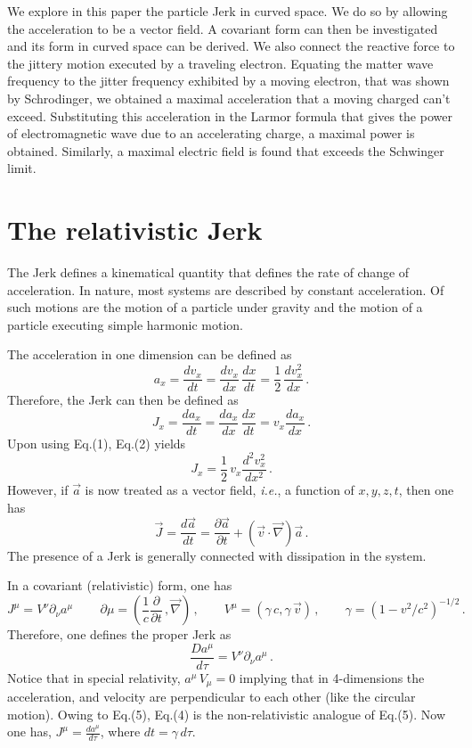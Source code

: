 \documentclass[a4]{epl2}
\begin{document}
We explore in this paper the particle Jerk in curved space. We do so by allowing the acceleration to be a vector field. A covariant form can then be investigated and its form in curved space can be derived. We also connect the reactive force to the jittery motion executed by a traveling  electron. Equating the matter wave frequency to the jitter frequency exhibited by a moving electron,   that was shown by Schrodinger,  we obtained a maximal acceleration that a moving charged can't exceed. Substituting this acceleration in the Larmor formula that gives  the power of electromagnetic wave due to an  accelerating charge, a maximal power is obtained. Similarly,  a maximal  electric field is found that exceeds the Schwinger limit.


\section{\textcolor[rgb]{0.00,0.07,1.00}{The relativistic Jerk}}

The Jerk defines a kinematical quantity that defines the rate of change of acceleration. In nature, most systems are described by constant acceleration. Of such motions are the  motion of a particle under gravity and the motion of a particle executing simple  harmonic motion.

The acceleration in one dimension can be  defined as
\begin{equation}
a_x=\frac{dv_x}{dt}=\frac{dv_x}{dx}\,\frac{dx}{dt}=\frac{1}{2}\,\frac{dv_x^2}{dx}\,.
 \end{equation}
Therefore, the Jerk can then be defined as
\begin{equation}
J_x=\frac{da_x}{dt}=\frac{da_x}{dx}\,\frac{dx}{dt}=v_x\frac{da_x}{dx}\,.
\end{equation}
Upon using Eq.(1), Eq.(2) yields
\begin{equation}
J_x=\frac{1}{2}\,v_x\frac{d^2v^2_x}{dx^2}\,.
\end{equation}
However, if $\vec{a}$ is now treated as a vector field, \emph{i.e.}, a function of $x, y, z, t$, then one has
\begin{equation}
\vec{J}=\frac{d\vec{a}}{dt}=\frac{\partial\vec{a}}{\partial t}+(\vec{v}\cdot\vec{\nabla})\vec{a}\,.
\end{equation}
The presence of a Jerk is generally connected with dissipation in the system.

In a covariant (relativistic) form, one has
\begin{equation}
J^{\mu}=V^\nu\partial_\nu  a^\mu\,\qquad \partial\mu=\left(\frac{1}{c}\frac{\partial}{\partial t}\,,\vec{\nabla}\right)\,,\qquad V^\mu=(\gamma\, c, \gamma\, \vec{v})\,,\qquad \gamma=(1-v^2/c^2)^{-1/2}\,.
\end{equation}
Therefore, one defines the proper Jerk as
\begin{equation}
\frac{Da^\mu}{d\tau}=V^\nu\partial_\nu a^\mu\,.
\end{equation}
Notice that in special relativity, $a^\mu\,V_\mu=0$ implying that in 4-dimensions the acceleration, and velocity are perpendicular to each other (like the circular motion).
Owing to Eq.(5), Eq.(4) is the non-relativistic analogue of Eq.(5). Now one has, $J^\mu=\frac{da^\mu}{d\tau}$, where $dt=\gamma\, d\tau$.
\end{document}
